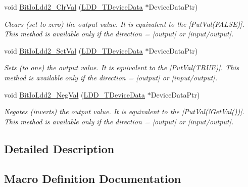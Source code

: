\begin{DoxyCompactItemize}
void \hyperlink{group___bit_io_ldd2__module_ga544e4e9c98ec5fa4934bcac68c17d303}{Bit\+Io\+Ldd2\+\_\+\+Clr\+Val} (\hyperlink{group___p_e___types__module_gac5cf1362f1f0e3a2ce71b1bf2276d091}{L\+D\+D\+\_\+\+T\+Device\+Data} $\ast$Device\+Data\+Ptr)
\begin{DoxyCompactList}\small\item\em Clears (set to zero) the output value. It is equivalent to the \mbox{[}Put\+Val(\+F\+A\+L\+S\+E)\mbox{]}. This method is available only if the direction = {\itshape \mbox{[}output\mbox{]}} or {\itshape \mbox{[}input/output\mbox{]}}. \end{DoxyCompactList}\item 
void \hyperlink{group___bit_io_ldd2__module_gaa2b2b2e4849f05c5454ca6eb6d88fe6d}{Bit\+Io\+Ldd2\+\_\+\+Set\+Val} (\hyperlink{group___p_e___types__module_gac5cf1362f1f0e3a2ce71b1bf2276d091}{L\+D\+D\+\_\+\+T\+Device\+Data} $\ast$Device\+Data\+Ptr)
\begin{DoxyCompactList}\small\item\em Sets (to one) the output value. It is equivalent to the \mbox{[}Put\+Val(\+T\+R\+U\+E)\mbox{]}. This method is available only if the direction = {\itshape \mbox{[}output\mbox{]}} or {\itshape \mbox{[}input/output\mbox{]}}. \end{DoxyCompactList}\item 
void \hyperlink{group___bit_io_ldd2__module_ga90ce20ceb13c4409d5526b15f0054e1a}{Bit\+Io\+Ldd2\+\_\+\+Neg\+Val} (\hyperlink{group___p_e___types__module_gac5cf1362f1f0e3a2ce71b1bf2276d091}{L\+D\+D\+\_\+\+T\+Device\+Data} $\ast$Device\+Data\+Ptr)
\begin{DoxyCompactList}\small\item\em Negates (inverts) the output value. It is equivalent to the \mbox{[}Put\+Val(!\+Get\+Val())\mbox{]}. This method is available only if the direction = {\itshape \mbox{[}output\mbox{]}} or {\itshape \mbox{[}input/output\mbox{]}}. \end{DoxyCompactList}\end{DoxyCompactItemize}


\subsection{Detailed Description}


\subsection{Macro Definition Documentation}
\mbox{\label{group___bit_io_ldd2__module_ga2cde86d856f0965fb132127390551a0d}} 
